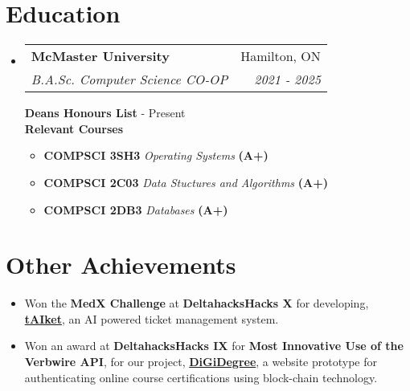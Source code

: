 \documentclass[a4paper,10pt]{article}
\makeatletter
\newcommand{\resumeSubheading}[4]{
  \vspace{-1pt}\item
    \begin{tabular*}{0.97\textwidth}[t]{l@{\extracolsep{\fill}}r}
      \textbf{#1} & #2 \\
      \textit{\normalsize#3} & \textit{\normalsize #4} \\
    \end{tabular*}\vspace{-7pt}
}
\newcommand{\resumeSubHeadingListStart}{\begin{itemize}[leftmargin=0.15in, label={}]}
\newcommand{\resumeSubHeadingListEnd}{\end{itemize}}
\makeatother
\begin{document}
\vspace{-15pt}
\section{Education}
\resumeSubHeadingListStart
\resumeSubheading
{McMaster University}{Hamilton, ON}
{B.A.Sc. Computer Science CO-OP }{2021 - 2025}

\vspace{7pt}
\textbf{Deans Honours List} - Present\\ 
\textbf{Relevant Courses}
\vspace{-5pt}
\begin{itemize}[leftmargin=0.15in, label={}]
  \item  \vspace{-1pt}  \textbf{COMPSCI 3SH3} \textit{Operating Systems }  \textbf{(A+)}
  \item  \vspace{-1pt}  \textbf{COMPSCI 2C03 } \textit{Data Stuctures and Algorithms}  \textbf{(A+)}
  \item  \vspace{-1pt}  \textbf{COMPSCI 2DB3} \textit{Databases}  \textbf{(A+)}
\end{itemize}
\vspace{-10pt}
\resumeSubHeadingListEnd

\section{Other Achievements}
\begin{itemize}[leftmargin=0.15in]
  \item  \vspace{-1pt}  Won the \textbf{MedX Challenge} at \textbf{DeltahacksHacks X} for developing, \href{https://devpost.com/software/placeholder-0hbrik}{\textbf{tAIket}}, an AI powered ticket management system.
  \item  \vspace{-1pt}  Won an award at \textbf{DeltahacksHacks IX} for \textbf{Most Innovative Use of the Verbwire API}, for our project, \href{https://devpost.com/software/digidegree?ref_content=my-projects-tab&ref_feature=my_projects}{\textbf{DiGiDegree}},  a website prototype for authenticating online course certifications using block-chain technology.
\end{itemize}
\end{document}
